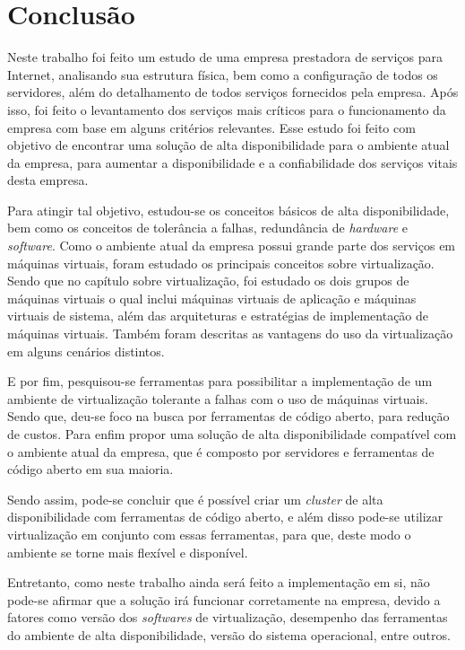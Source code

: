 \chapter{Conclusão}
\label{cap:conclusao}

Neste trabalho foi feito um estudo de uma empresa prestadora de serviços para Internet, analisando sua estrutura física, bem como a configuração
de todos os servidores, além do detalhamento de todos serviços fornecidos pela empresa. Após isso, foi feito o levantamento dos serviços mais 
críticos para o funcionamento da empresa com base em alguns critérios relevantes. Esse estudo foi feito com objetivo de encontrar 
uma solução de alta disponibilidade para o ambiente atual da empresa, para aumentar a disponibilidade e a confiabilidade dos serviços vitais desta 
empresa.

Para atingir tal objetivo, estudou-se os conceitos básicos de alta disponibilidade, bem como os conceitos de tolerância a falhas, redundância de
\textit{hardware} e \textit{software}. Como o ambiente atual da empresa possui grande parte dos serviços em máquinas virtuais, foram estudado
os principais conceitos sobre virtualização. Sendo que no capítulo sobre virtualização, foi estudado os dois grupos de máquinas virtuais o qual 
inclui máquinas virtuais de aplicação e máquinas virtuais de sistema, além das arquiteturas e estratégias de implementação de máquinas virtuais. 
Também foram descritas as vantagens do uso da virtualização em alguns cenários distintos.

E por fim, pesquisou-se ferramentas para possibilitar a implementação de um ambiente de virtualização tolerante a falhas com o uso de máquinas 
virtuais. Sendo que, deu-se foco na busca por ferramentas de código aberto, para redução de custos. Para enfim propor uma solução de alta 
disponibilidade compatível com o ambiente atual da empresa, que é composto por servidores e ferramentas de código aberto em sua maioria.

Sendo assim, pode-se concluir que é possível criar um \textit{cluster} de alta disponibilidade com ferramentas de código aberto, e além disso 
pode-se utilizar virtualização em conjunto com essas ferramentas, para que, deste modo o ambiente se torne mais flexível e disponível. 

Entretanto, como neste trabalho ainda será feito a implementação em si, não pode-se afirmar que a solução irá funcionar corretamente
na empresa, devido a fatores como versão dos \textit{softwares} de virtualização, desempenho das ferramentas do ambiente de alta disponibilidade, 
versão do sistema operacional, entre outros.

